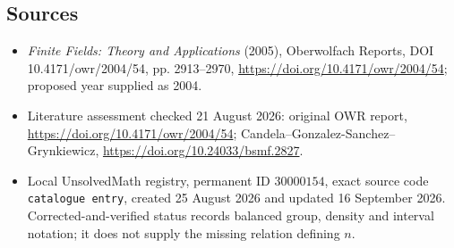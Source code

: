\documentclass[11pt]{article}
\begin{document}
\subsection{Sources}
\begin{itemize}
\item \emph{Finite Fields: Theory and Applications} (2005), Oberwolfach Reports, DOI 10.4171/owr/2004/54, pp. 2913--2970, \url{https://doi.org/10.4171/owr/2004/54}; proposed year supplied as 2004.
\item Literature assessment checked 21 August 2026: original OWR report, \url{https://doi.org/10.4171/owr/2004/54}; Candela--Gonzalez-Sanchez--Grynkiewicz, \url{https://doi.org/10.24033/bsmf.2827}.
\item Local UnsolvedMath registry, permanent ID $30000154$, exact source code \texttt{catalogue entry}, created 25 August 2026 and updated 16 September 2026. Corrected-and-verified status records balanced group, density and interval notation; it does not supply the missing relation defining $n$.
\end{itemize}
\end{document}
